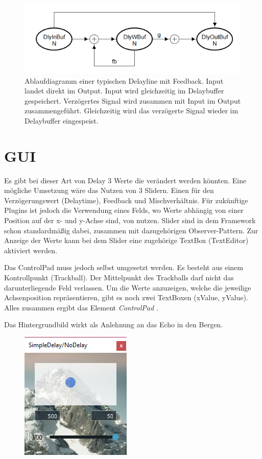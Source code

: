 \begin{figure}
	\centering
	\includegraphics[width=0.7\linewidth]{images/delayline}
	\caption{Ablaufdiagramm einer typischen Delayline mit Feedback. Input landet direkt im Output. Input wird gleichzeitig im Delaybuffer gespeichert. Verzögertes Signal wird zusammen mit Input im Output zusammengeführt. Gleichzeitig wird das verzögerte Signal wieder im Delaybuffer eingespeist. \cite{HTC}}
	\label{fig:delayline}
\end{figure}


\section{GUI}

Es gibt bei dieser Art von Delay 3 Werte die verändert werden könnten. Eine mögliche Umsetzung wäre das Nutzen von 3 Slidern. Einen für den Verzögerungswert (Delaytime), Feedback und Mischverhältnis. Für zukünftige Plugins ist jedoch die Verwendung eines Felds, wo Werte abhängig von einer Position auf der x- und y-Achse sind, von nutzen. 
Slider sind in dem Framework schon standardmäßig dabei, zusammen mit dazugehörigen Observer-Pattern. Zur Anzeige der Werte kann bei dem Slider eine zugehörige TextBox (TextEditor) aktiviert werden.

Das ControlPad muss jedoch selbst umgesetzt werden. Es besteht aus einem Kontrollpunkt (Trackball). Der Mittelpunkt des Trackballs darf nicht das darunterliegende Feld verlassen. Um die Werte anzuzeigen, welche die jeweilige Achsenposition repräsentieren, gibt es noch zwei TextBoxen (xValue, yValue). Alles zusammen ergibt das Element \textit{ControlPad }.

Das Hintergrundbild wirkt als Anlehnung an das Echo in den Bergen. 

\begin{figure}
	\centering
	\includegraphics[width=0.5\linewidth]{images/plugininableton}
	\caption{}
	\label{fig:plugininableton}
\end{figure}


